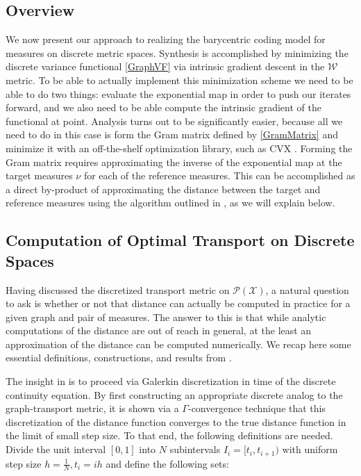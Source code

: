\documentclass{article}
\newcommand{\W}{\mathcal{W}}
\newcommand{\X}{\mathcal{X}}
\begin{document}
\subsection{Overview}
We now present our approach to realizing the barycentric coding model for measures on discrete metric spaces.  Synthesis is accomplished by minimizing the discrete variance functional \eqref{GraphVF} via intrinsic gradient descent in the \(\W\) metric. To be able to actually implement this minimization scheme we need to be able to do two things: evaluate the exponential map in order to push our iterates forward, and we also need to be able compute the intrinsic gradient of the functional at point. Analysis turns out to be significantly easier, because all we need to do in this case is form the Gram matrix defined by \eqref{GramMatrix} and minimize it with an off-the-shelf optimization library, such as CVX \cite{cvx, gb08}. Forming the Gram matrix requires approximating the inverse of the exponential map at the target measures \(\nu\) for each of the reference measures. This can be accomplished as a direct by-product of approximating the distance between the target and reference measures using the algorithm outlined in \cite{erbarComputationOptimalTransport2020}, as we will explain below.

\subsection{Computation of Optimal Transport on Discrete Spaces}
\label{DOTsec}
Having discussed the discretized transport metric on \(\mathcal{P}(\X)\), a natural question to ask is whether or not that distance can actually be computed in practice for a given graph and pair of measures. The answer to this is that while analytic computations of the distance are out of reach in general, at the least an approximation of the distance can be computed numerically. We recap here some essential definitions, constructions, and results from \cite{erbarComputationOptimalTransport2020}.

The insight in \cite{erbarComputationOptimalTransport2020} is to proceed via Galerkin discretization in time of the discrete continuity equation. By first constructing an appropriate discrete analog to the graph-transport metric, it is shown via a \(\Gamma\)-convergence technique that this discretization of the distance function converges to the true distance function in the limit of small step size. To that end, the following definitions are needed. Divide the unit interval \([0,1]\) into \(N\) subintervals \(I_i = [t_i, t_{i + 1})\) with uniform step size \(h = \frac{1}{N}, t_i = ih\) and define the following sets:
\end{document}
